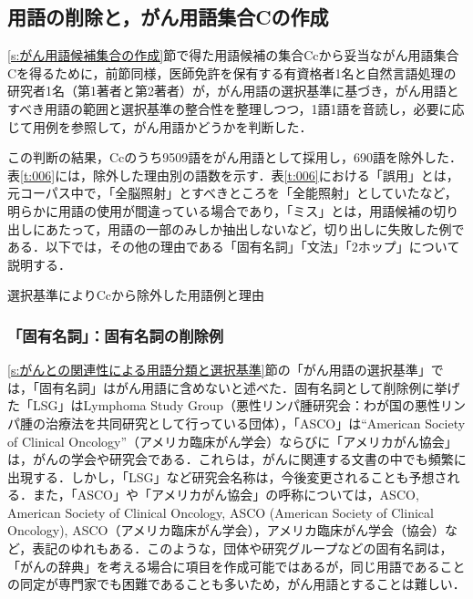 \documentclass[japanese]{jnlp_1.4}
\begin{document}
\subsection{用語の削除と，がん用語集合Cの作成}
\label{s:用語の削除と，がん用語集合Cの作成}

\ref{s:がん用語候補集合の作成}節で得た用語候補の集合Ccから妥当ながん用語集合Cを得るために，前節同様，医師免許を保有する有資格者1名と自然言語処理の研究者1名（第1著者と第2著者）が，がん用語の選択基準に基づき，がん用語とすべき用語の範囲と選択基準の整合性を整理しつつ，1語1語を音読し，必要に応じて用例を参照して，がん用語かどうかを判断した．

この判断の結果，Ccのうち9509語をがん用語として採用し，690語を除外した．表\ref{t:006}には，除外した理由別の語数を示す．表\ref{t:006}における「誤用」とは，元コーパス中で，「全脳照射」とすべきところを「全能照射」としていたなど，明らかに用語の使用が間違っている場合であり，「ミス」とは，用語候補の切り出しにあたって，用語の一部のみしか抽出しないなど，切り出しに失敗した例である．以下では，その他の理由である「固有名詞」「文法」「2ホップ」について説明する．

\begin{table}[b]
 \caption{選択基準によりCcから除外した用語例と理由}
 \begin{center}

 \end{center}
 \label{t:006}
\end{table}


\subsubsection{「固有名詞」：固有名詞の削除例}
\label{s:「固有名詞」：固有名詞の削除例}

\ref{s:がんとの関連性による用語分類と選択基準}節の「がん用語の選択基準」では，「固有名詞」はがん用語に含めないと述べた．固有名詞として削除例に挙げた「LSG」はLymphoma Study Group（悪性リンパ腫研究会：わが国の悪性リンパ腫の治療法を共同研究として行っている団体），「ASCO」は``American Society of Clinical Oncology''（アメリカ臨床がん学会）ならびに「アメリカがん協会」は，がんの学会や研究会である．これらは，がんに関連する文書の中でも頻繁に出現する．しかし，「LSG」など研究会名称は，今後変更されることも予想される．また，「ASCO」や「アメリカがん協会」の呼称については，ASCO, American Society of Clinical Oncology, ASCO (American Society of Clinical Oncology), ASCO（アメリカ臨床がん学会），アメリカ臨床がん学会（協会）など，表記のゆれもある．このような，団体や研究グループなどの固有名詞は，「がんの辞典」を考える場合に項目を作成可能ではあるが，同じ用語であることの同定が専門家でも困難であることも多いため，がん用語とすることは難しい．
\end{document}
